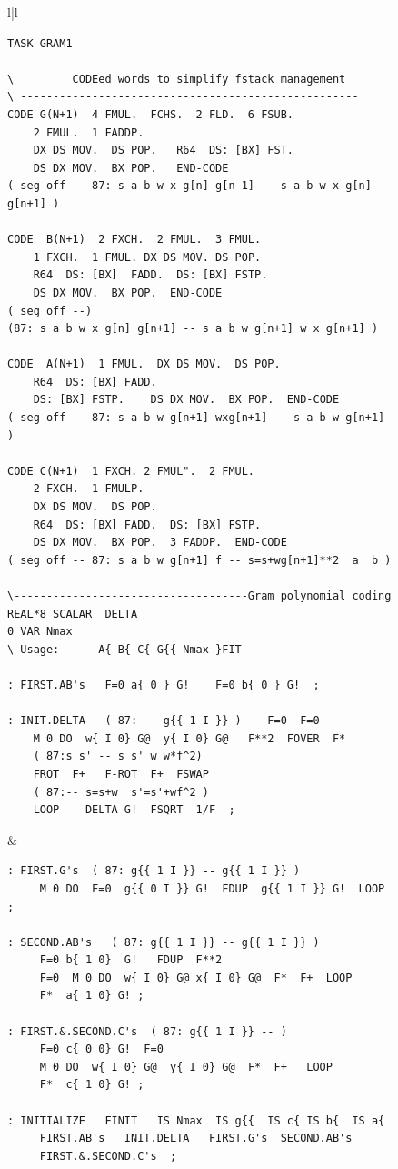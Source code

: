 \begin{figure}[H]
    \centering
    \tiny
    \setlength{\tabcolsep}{.4em}
    \begin{tabular}{l|l}
        \begin{lstlisting}
TASK GRAM1

\         CODEed words to simplify fstack management
\ ----------------------------------------------------
CODE G(N+1)  4 FMUL.  FCHS.  2 FLD.  6 FSUB.
    2 FMUL.  1 FADDP.
    DX DS MOV.  DS POP.   R64  DS: [BX] FST.
    DS DX MOV.  BX POP.   END-CODE
( seg off -- 87: s a b w x g[n] g[n-1] -- s a b w x g[n] g[n+1] )

CODE  B(N+1)  2 FXCH.  2 FMUL.  3 FMUL.
    1 FXCH.  1 FMUL. DX DS MOV. DS POP.
    R64  DS: [BX]  FADD.  DS: [BX] FSTP.
    DS DX MOV.  BX POP.  END-CODE
( seg off --)
(87: s a b w x g[n] g[n+1] -- s a b w g[n+1] w x g[n+1] )

CODE  A(N+1)  1 FMUL.  DX DS MOV.  DS POP.
    R64  DS: [BX] FADD.
    DS: [BX] FSTP.    DS DX MOV.  BX POP.  END-CODE
( seg off -- 87: s a b w g[n+1] wxg[n+1] -- s a b w g[n+1] )

CODE C(N+1)  1 FXCH. 2 FMUL".  2 FMUL.
    2 FXCH.  1 FMULP.
    DX DS MOV.  DS POP.
    R64  DS: [BX] FADD.  DS: [BX] FSTP.
    DS DX MOV.  BX POP.  3 FADDP.  END-CODE
( seg off -- 87: s a b w g[n+1] f -- s=s+wg[n+1]**2  a  b )

\------------------------------------Gram polynomial coding
REAL*8 SCALAR  DELTA
0 VAR Nmax
\ Usage:      A{ B{ C{ G{{ Nmax }FIT

: FIRST.AB's   F=0 a{ 0 } G!    F=0 b{ 0 } G!  ;

: INIT.DELTA   ( 87: -- g{{ 1 I }} )    F=0  F=0
    M 0 DO  w{ I 0} G@  y{ I 0} G@   F**2  FOVER  F* 
    ( 87:s s' -- s s' w w*f^2)
    FROT  F+   F-ROT  F+  FSWAP
    ( 87:-- s=s+w  s'=s'+wf^2 )
    LOOP    DELTA G!  FSQRT  1/F  ;
        \end{lstlisting}
      &
        \begin{lstlisting}
: FIRST.G's  ( 87: g{{ 1 I }} -- g{{ 1 I }} ) 
     M 0 DO  F=0  g{{ 0 I }} G!  FDUP  g{{ 1 I }} G!  LOOP  ;

: SECOND.AB's   ( 87: g{{ 1 I }} -- g{{ 1 I }} )
     F=0 b{ 1 0}  G!   FDUP  F**2
     F=0  M 0 DO  w{ I 0} G@ x{ I 0} G@  F*  F+  LOOP  
     F*  a{ 1 0} G! ;

: FIRST.&.SECOND.C's  ( 87: g{{ 1 I }} -- )
     F=0 c{ 0 0} G!  F=0
     M 0 DO  w{ I 0} G@  y{ I 0} G@  F*  F+   LOOP
     F*  c{ 1 0} G! ;

: INITIALIZE   FINIT   IS Nmax  IS g{{  IS c{ IS b{  IS a{
     FIRST.AB's   INIT.DELTA   FIRST.G's  SECOND.AB's
     FIRST.&.SECOND.C's  ;


\end{lstlisting}
\end{tabular}
\end{figure}
